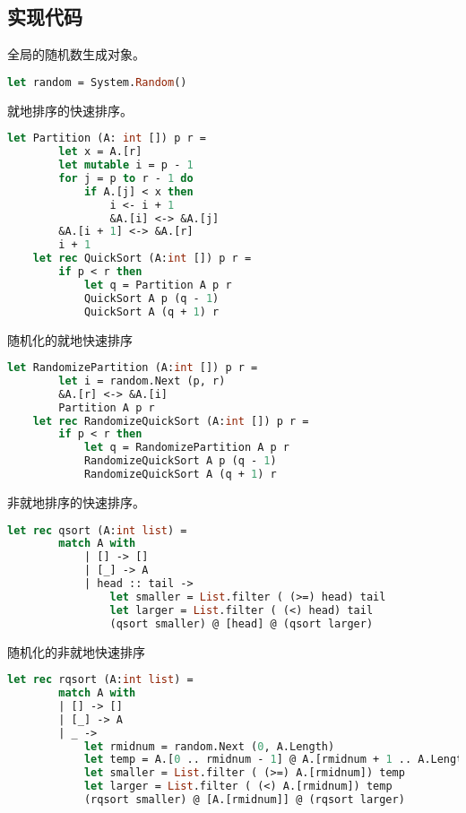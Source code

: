 \documentclass[a4paper]{article}
\begin{document}
\subsection{实现代码}

全局的随机数生成对象。

\begin{lstlisting}[language=ML]
    let random = System.Random()
\end{lstlisting}

就地排序的快速排序。

\begin{lstlisting}[language=ML]
    let Partition (A: int []) p r =
        let x = A.[r]
        let mutable i = p - 1
        for j = p to r - 1 do
            if A.[j] < x then 
                i <- i + 1
                &A.[i] <-> &A.[j]
        &A.[i + 1] <-> &A.[r]
        i + 1
    let rec QuickSort (A:int []) p r =
        if p < r then
            let q = Partition A p r
            QuickSort A p (q - 1)
            QuickSort A (q + 1) r
\end{lstlisting}

随机化的就地快速排序

\begin{lstlisting}[language=ML]
    let RandomizePartition (A:int []) p r =
        let i = random.Next (p, r)
        &A.[r] <-> &A.[i]
        Partition A p r
    let rec RandomizeQuickSort (A:int []) p r =
        if p < r then
            let q = RandomizePartition A p r
            RandomizeQuickSort A p (q - 1)
            RandomizeQuickSort A (q + 1) r
\end{lstlisting}

非就地排序的快速排序。

\begin{lstlisting}[language=ML]
    let rec qsort (A:int list) = 
        match A with 
            | [] -> []
            | [_] -> A
            | head :: tail -> 
                let smaller = List.filter ( (>=) head) tail
                let larger = List.filter ( (<) head) tail
                (qsort smaller) @ [head] @ (qsort larger)
\end{lstlisting}

随机化的非就地快速排序

\begin{lstlisting}[language=ML]
    let rec rqsort (A:int list) =
        match A with
        | [] -> []
        | [_] -> A
        | _ ->
            let rmidnum = random.Next (0, A.Length)
            let temp = A.[0 .. rmidnum - 1] @ A.[rmidnum + 1 .. A.Length - 1] //temp is A - [A.[rmidnum]]
            let smaller = List.filter ( (>=) A.[rmidnum]) temp
            let larger = List.filter ( (<) A.[rmidnum]) temp
            (rqsort smaller) @ [A.[rmidnum]] @ (rqsort larger)
\end{lstlisting}
\end{document}
